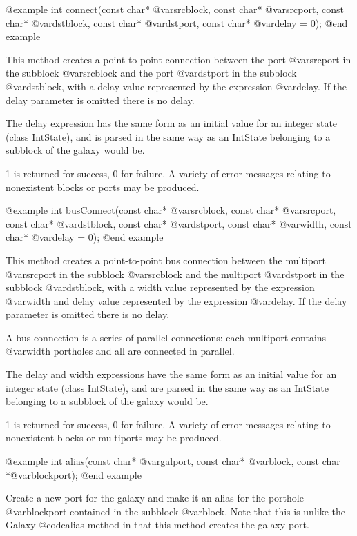 @example
int connect(const char* @var{srcblock}, const char* @var{srcport},
            const char* @var{dstblock}, const char* @var{dstport},
            const char* @var{delay} = 0);
@end example

This method creates a point-to-point connection between the port
@var{srcport} in the subblock @var{srcblock} and the port @var{dstport}
in the subblock @var{dstblock}, with a delay value represented by
the expression @var{delay}.
If the delay parameter is omitted there is no delay.

The delay expression has the same form as an initial value for an
integer state (class IntState), and is parsed in the same way as
an IntState belonging to a subblock of the galaxy would be.

1 is returned for success, 0 for failure.
A variety of error messages relating to nonexistent blocks or ports
may be produced.

@example
int busConnect(const char* @var{srcblock}, const char* @var{srcport},
               const char* @var{dstblock}, const char* @var{dstport},
               const char* @var{width}, const char* @var{delay} = 0);
@end example

This method creates a point-to-point bus connection between the multiport
@var{srcport} in the subblock @var{srcblock} and the multiport @var{dstport}
in the subblock @var{dstblock}, with a width value represented by the
expression @var{width} and delay value represented by
the expression @var{delay}.  If the delay parameter is omitted there is
no delay.

A bus connection is a series of parallel connections: each multiport
contains @var{width} portholes and all are connected in parallel.

The delay and width expressions have the same form as an initial value for an
integer state (class IntState), and are parsed in the same way as
an IntState belonging to a subblock of the galaxy would be.

1 is returned for success, 0 for failure.
A variety of error messages relating to nonexistent blocks or multiports
may be produced.

@example
int alias(const char* @var{galport}, const char* @var{block}, const char *@var{blockport});
@end example

Create a new port for the galaxy and make it an alias for the porthole
@var{blockport} contained in the subblock @var{block}.  Note that this
is unlike the Galaxy @code{alias} method in that this method creates
the galaxy port.

